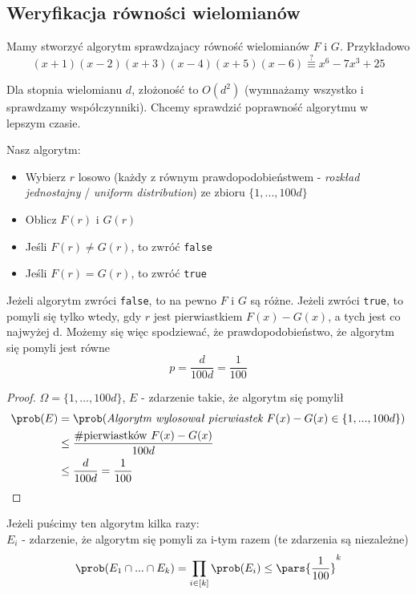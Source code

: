 \subsection{Weryfikacja równości wielomianów}
Mamy stworzyć algorytm sprawdzajacy równość wielomianów \(F\) i \(G\). Przykładowo \\
\[
	(x+1)(x-2)(x+3)(x-4)(x+5)(x-6) \overset{?}{\equiv} x^6 - 7x^3 + 25
\]

Dla stopnia wielomianu \(d\), złożoność to \(O(d^2)\) (wymnażamy wszystko i sprawdzamy współczynniki). Chcemy sprawdzić poprawność algorytmu w lepszym czasie.

Nasz algorytm:
\begin{itemize}
	\item Wybierz \(r\) losowo (każdy z równym prawdopodobieństwem - \textit{rozkład jednostajny} / \textit{uniform distribution}) ze zbioru \(\{1,...,100d\}\)
	\item Oblicz \(F(r)\) i \(G(r)\)
	\item Jeśli \(F(r) \neq G(r)\), to zwróć \texttt{false}
	\item Jeśli \(F(r) = G(r)\), to zwróć \texttt{true}
\end{itemize}

Jeżeli algorytm zwróci \texttt{false}, to na pewno \(F\) i \(G\) są różne. Jeżeli zwróci \texttt{true}, to pomyli się tylko wtedy, gdy \(r\) jest pierwiastkiem \(F(x) - G(x)\), a tych jest co najwyżej d. Możemy się więc spodziewać, że prawdopodobieństwo, że algorytm się pomyli jest równe
\[
	p = \frac{d}{100d} = \frac{1}{100}
\]

\begin{proof}
	\(\Omega = \{1,...,100d\}\), \(E\) - zdarzenie takie, że algorytm się pomylił
	\begin{align*}
		\prob(E) & = \prob(\textit{Algorytm wylosował pierwiastek $F(x) - G(x) \in \{1, ..., 100d\}$}) \\
		         & \leq \frac{\#\text{pierwiastków } F(x) - G(x)}{100d}                                \\
		         & \leq \frac{d}{100d} = \frac{1}{100}
	\end{align*}
\end{proof}

\noindent Jeżeli puścimy ten algorytm kilka razy: \\
\(E_i\) - zdarzenie, że algorytm się pomyli za i-tym razem (te zdarzenia są niezależne) \\
\[
	\prob(E_1 \cap ... \cap E_k) = \prod_{i \in [k]}\prob(E_i) \leq \pars{\frac{1}{100}}^k
\]


